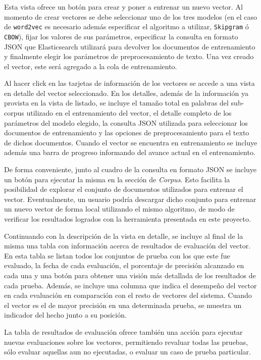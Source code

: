 Esta vista ofrece un botón para crear y poner a entrenar un nuevo vector. Al momento de crear vectores se
debe seleccionar uno de los tres modelos (en el caso de \texttt{word2vec} es necesario además especificar
el algoritmo a utilizar, \texttt{Skipgram} ó \texttt{CBOW}), fijar los valores de sus parámetros,
especificar la consulta en formato JSON que Elasticsearch utilizará para devolver los documentos de
entrenamiento y finalmente elegir los parámetros de preprocesamiento de texto. Una vez creado el vector,
este será agregado a la cola de entrenamiento.

Al hacer click en las tarjetas de información de los vectores se accede a una vista en detalle del vector
seleccionado. En los detalles, además de la información ya provista en la vista de listado, se incluye el
tamaño total en palabras del sub-corpus utilizado en el entrenamiento del vector, el detalle completo de
los parámetros del modelo elegido, la consulta JSON utilizada para seleccionar los documentos de
entrenamiento y las opciones de preprocesamiento para el texto de dichos documentos. Cuando el vector se
encuentra en entrenamiento se incluye además una barra de progreso informando del avance actual en el
entrenamiento.

De forma conveniente, junto al cuadro de la consulta en formato JSON se incluye un botón para ejecutar la
misma en la sección de \textit{Corpus}. Esto facilita la posibilidad de explorar el conjunto de documentos
utilizados para entrenar el vector. Eventualmente, un usuario podría descargar dicho conjunto para entrenar
un nuevo vector de forma local utilizando el mismo algoritmo, de modo de verificar los resultados logrados
con la herramienta presentada en este proyecto.

Continuando con la descripción de la vista en detalle, se incluye al final de la misma una tabla con
información acerca de resultados de evaluación del vector. En esta tabla se listan todos los conjuntos de
prueba con los que este fue evaluado, la fecha de cada evaluación, el porcentaje de precisión alcanzado en
cada una y una botón para obtener una visión más detallada de los resultados de cada prueba. Además, se
incluye una columna que indica el desempeño del vector en cada evaluación en comparación con el resto de
vectores del sistema. Cuando el vector es el de mayor precisión en una determinada prueba, se muestra un
indicador del hecho junto a su posición.

La tabla de resultados de evaluación ofrece también una acción para ejecutar nuevas evaluaciones sobre los
vectores, permitiendo revaluar todas las pruebas, sólo evaluar aquellas aun no ejecutadas, o evaluar un
caso de prueba particular.

